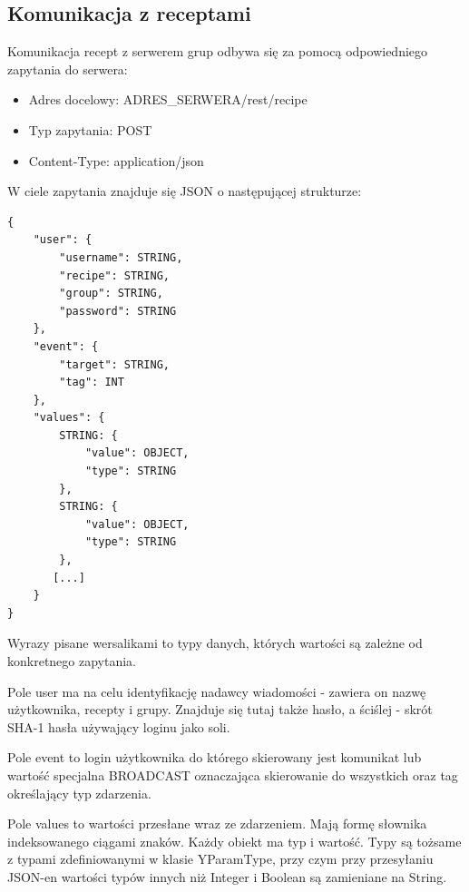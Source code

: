 \documentclass[11pt,a4paper,polish,thesis]{dcsbook}
\begin{document}
\subsection{Komunikacja z receptami}
Komunikacja recept z serwerem grup odbywa się za pomocą odpowiedniego zapytania do serwera:
\begin{itemize}
\item Adres docelowy: ADRES\_SERWERA/rest/recipe
\item Typ zapytania: POST
\item Content-Type: application/json
\end{itemize}

W ciele zapytania znajduje się JSON o następującej strukturze:
\begin{verbatim}
{
    "user": {
        "username": STRING,
        "recipe": STRING,
        "group": STRING,
        "password": STRING
    },
    "event": {
        "target": STRING,
        "tag": INT
    },
    "values": {
        STRING: {
            "value": OBJECT,
            "type": STRING
        },
        STRING: {
            "value": OBJECT,
            "type": STRING
        },
       [...]
    }
}
\end{verbatim}

Wyrazy pisane wersalikami to typy danych, których wartości są zależne od konkretnego zapytania.

Pole user ma na celu identyfikację nadawcy wiadomości - zawiera on nazwę użytkownika, recepty i grupy. Znajduje się tutaj także hasło, a ściślej - skrót SHA-1 hasła używający loginu jako soli. 

Pole event to login użytkownika do którego skierowany jest komunikat lub wartość specjalna BROADCAST oznaczająca skierowanie do wszystkich oraz tag określający typ zdarzenia.

Pole values to wartości przesłane wraz ze zdarzeniem. Mają formę słownika indeksowanego ciągami znaków. Każdy obiekt ma typ i wartość. Typy są tożsame z typami zdefiniowanymi w klasie YParamType, przy czym przy przesyłaniu JSON-en wartości typów innych niż Integer i Boolean są zamieniane na String.
\end{document}
